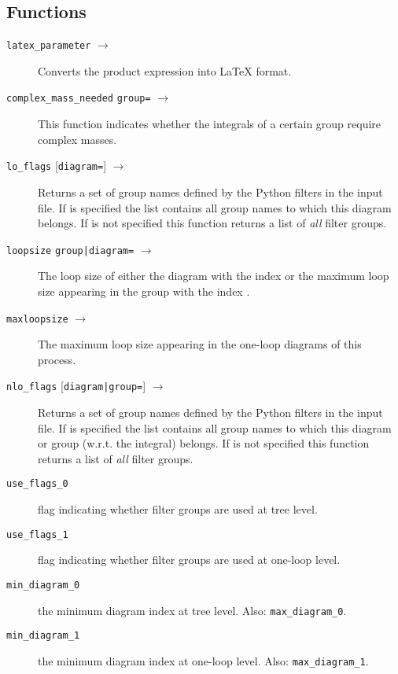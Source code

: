 \documentclass[11pt,a4paper]{refrep}
\begin{document}
\subsection{Functions}
\begin{description}
\item[\texttt{latex\_parameter}  $\to$ ]
   Converts the product expression  into \LaTeX{}
   format.
\item[\texttt{complex\_mass\_needed} \texttt{group=}
   $\to$ ]
    This function indicates whether the integrals of a certain group
    require complex masses.
\item[\texttt{lo\_flags} {[\texttt{diagram=}]} $\to$
   ]
    Returns a set of group names defined by the Python filters in the
    input file.
    If  is specified the list contains all group names
    to which this diagram belongs. If  is not specified
    this function returns a list of \emph{all} filter groups.
\item[\texttt{loopsize}
   \texttt{group|diagram=} $\to$ ]
    The loop size of either the diagram with the index  or
    the maximum loop size appearing in the group with the index .
\item[\texttt{maxloopsize} $\to$ ]
    The maximum loop size appearing in the one-loop diagrams of this
    process.
\item[\texttt{nlo\_flags} {[\texttt{diagram|group=}]} $\to$
   ]
    Returns a set of group names defined by the Python filters in the
    input file.
    If  is specified the list contains all group names
    to which this diagram or group (w.r.t. the integral) belongs.
    If  is not specified
    this function returns a list of \emph{all} filter groups.
\item[\texttt{use\_flags\_0}] flag indicating whether filter groups
    are used at tree level.
\item[\texttt{use\_flags\_1}] flag indicating whether filter groups
    are used at one-loop level.
\item[\texttt{min\_diagram\_0}] the minimum diagram index at tree level.
    Also: \texttt{max\_diagram\_0}.
\item[\texttt{min\_diagram\_1}] the minimum diagram index at one-loop level.
    Also: \texttt{max\_diagram\_1}.
\end{description}
\end{document}
